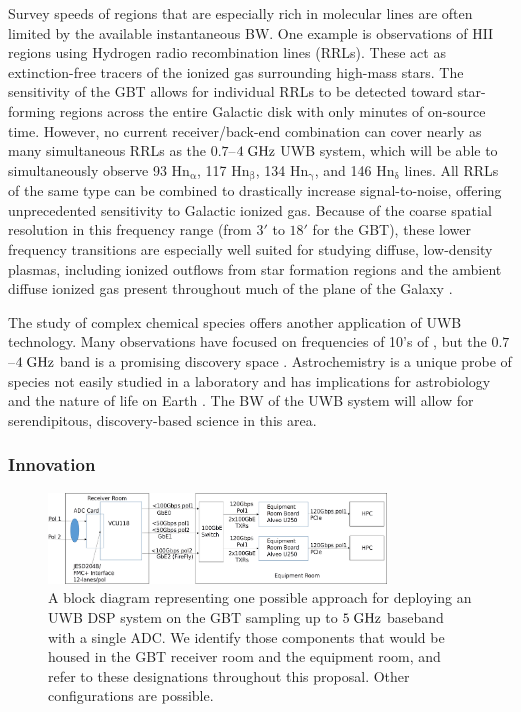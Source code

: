 \documentclass[10pt]{myNSF}
\begin{document}
 Survey speeds of regions that
are especially rich in molecular lines are often limited by the
available instantaneous BW.  One example is observations of H{\sc II}
regions using Hydrogen radio recombination lines (RRLs).  These act as
extinction-free tracers of the ionized gas surrounding high-mass
stars.  The sensitivity of the GBT allows for individual RRLs to be
detected toward star-forming regions across the entire Galactic disk
with only minutes of on-source time.  However, no current
receiver/back-end combination can cover nearly as many simultaneous
RRLs as the $0.7$--$4\; \textrm{GHz}$ UWB system, which will be able to
simultaneously observe 93 $\mathrm{Hn_\alpha}$, 117
$\mathrm{Hn_\beta}$, 134 $\mathrm{Hn_\gamma}$, and 146
$\mathrm{Hn_\delta}$ lines. All RRLs of the same type can be combined
to drastically increase signal-to-noise, offering unprecedented
sensitivity to Galactic ionized gas.  Because of the coarse spatial
resolution in this frequency range (from $3'$ to $18'$ for the GBT),
these lower frequency transitions are especially well suited for
studying diffuse, low-density plasmas, including ionized outflows from
star formation regions and the ambient diffuse ionized gas present
throughout much of the plane of the Galaxy \cite{lab+17}.

The study of complex chemical species offers another application of
UWB technology.  Many observations have focused on frequencies of 10's
of \GHz, but the $0.7$--$4\; \textrm{GHz}$ band is a promising discovery space
\citep[e.g.][]{mlc+12,frsw14,thc+17}.  Astrochemistry is a unique
probe of species not easily studied in a laboratory and has
implications for astrobiology and the nature of life on Earth
\cite{mcl+16}.  The BW of the UWB system will allow for serendipitous,
discovery-based science in this area.

\subsubsection{Innovation}
\label{sec:innovation}

\begin{figure}
  \centering
  \includegraphics[width=0.8\textwidth]{topologies.png}
  \caption{A block diagram representing one possible approach for
    deploying an UWB DSP system on the GBT sampling up to $5\; \textrm{GHz}$
    baseband with a single ADC.  We identify those components that
    would be housed in the GBT receiver room and the equipment room,
    and refer to these designations throughout this proposal. Other
    configurations are possible.  \label{fig:block_diagram}}
\end{figure}
\end{document}
